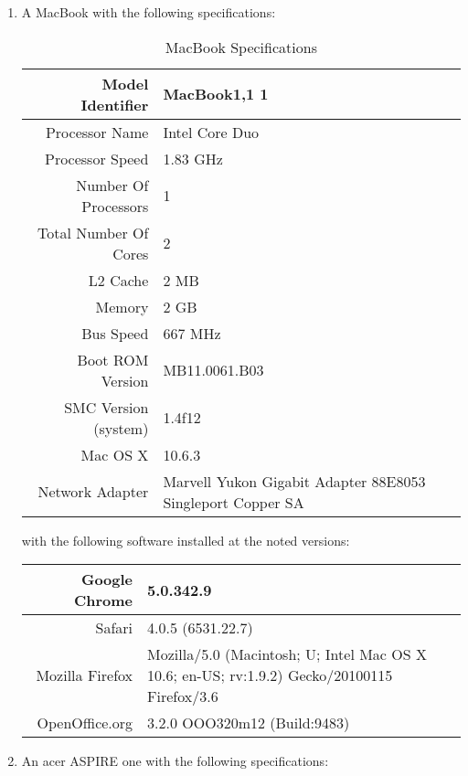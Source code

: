 \begin{enumerate}

\item A MacBook with the following specifications:

  \begin{table}[htbp]
    \caption{MacBook Specifications}
    \begin{tabular}{| r | p{5cm} |}
      \hline
      Model Identifier      & MacBook1,1 1 \\ \hline
      Processor Name        & Intel Core Duo \\ \hline
      Processor Speed       & 1.83 GHz \\ \hline
      Number Of Processors  & 1 \\ \hline
      Total Number Of Cores & 2 \\ \hline
      L2 Cache              & 2 MB \\ \hline
      Memory                & 2 GB \\ \hline
      Bus Speed             & 667 MHz \\ \hline
      Boot ROM Version      & MB11.0061.B03 \\ \hline
      SMC Version (system)  & 1.4f12 \\ \hline
      Mac OS X              & 10.6.3 \\ \hline
      Network  Adapter      & Marvell Yukon Gigabit Adapter 88E8053 Singleport
      Copper SA \\
      \hline
    \end{tabular}
  \end{table}

  with the following software installed at the noted versions:

  \begin{table}[htbp]
    \begin{tabular}{| r | p{5cm} |}
      \hline
      Google Chrome       & 5.0.342.9 \\ \hline
      Safari              & 4.0.5 (6531.22.7) \\ \hline
      Mozilla Firefox     & Mozilla/5.0 (Macintosh; U; Intel Mac OS X 10.6; en-US;
                            rv:1.9.2) Gecko/20100115 Firefox/3.6 \\ \hline
      OpenOffice.org      & 3.2.0 OOO320m12 (Build:9483) \\
      \hline
    \end{tabular}
  \end{table}

\item An acer ASPIRE one with the following specifications:


\end{enumerate}
